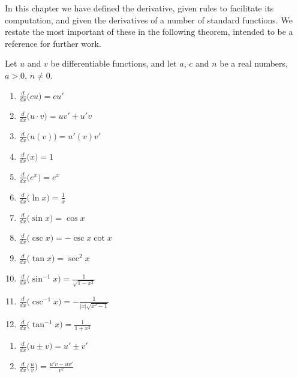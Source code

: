 
In this chapter we have defined the derivative, given rules to facilitate its computation, and given the derivatives of a number of standard functions. We restate the most important of these in the following theorem, intended to be a reference for further work.

{Let $u$ and $v$ be differentiable functions, and let $a$, $c$ and $n$ be a real numbers, $a>0$, $n\neq 0$. \\

\noindent%
	\begin{minipage}{.5\specialboxlength}
	\begin{enumerate}
	\item		$\frac{d}{dx}\big(cu\big) = cu'$\addtocounter{enumi}{1}
	\item		$\frac{d}{dx}\big(u\cdot v\big) = uv'+u'v$\addtocounter{enumi}{1}
	\item		$\frac{d}{dx}\big(u(v)\big) = u'(v)v'$\addtocounter{enumi}{1}
	\item		$\frac{d}{dx}\big(x\big) = 1$\addtocounter{enumi}{1}
	\item		$\frac{d}{dx}\big(e^x\big) = e^x$\addtocounter{enumi}{1}
	\item		$\frac{d}{dx}\big(\ln x\big) = \frac{1}{x}$\addtocounter{enumi}{1}
	\item		$\frac{d}{dx}\big(\sin x\big) = \cos x$\addtocounter{enumi}{1}
	\item		$\frac{d}{dx}\big(\csc x\big) = -\csc x\cot x$\addtocounter{enumi}{1}
	\item		$\frac{d}{dx}\big(\tan x\big) = \sec^2x$\addtocounter{enumi}{1}
	\item		$\frac{d}{dx}\big(\sin^{-1}x\big) = \frac{1}{\sqrt{1-x^2}}$\addtocounter{enumi}{1}
	\item		$\frac{d}{dx}\big(\csc^{-1}x\big) = -\frac{1}{|x|\sqrt{x^2-1}}$\addtocounter{enumi}{1}
	\item		$\frac{d}{dx}\big(\tan^{-1}x\big) = \frac{1}{1+x^2}$\addtocounter{enumi}{1}
	\end{enumerate}
\normalsize
\end{minipage}
\begin{minipage}{.5\specialboxlength}
	\begin{enumerate}\addtocounter{enumi}{1}
	\item		$\frac{d}{dx}\big(u\pm v\big) = u'\pm v'$\addtocounter{enumi}{1}
	\item		$\frac{d}{dx}\big(\frac uv\big) = \frac{u'v-uv'}{v^2}$\addtocounter{enumi}{1}

\end{enumerate}
\end{minipage}}
